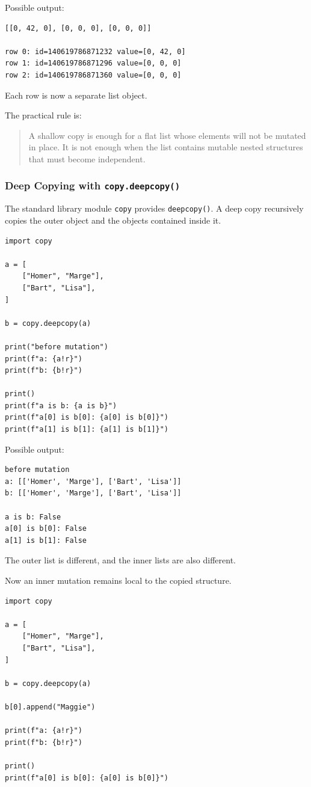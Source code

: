 Possible output:

\begin{verbatim}
[[0, 42, 0], [0, 0, 0], [0, 0, 0]]

row 0: id=140619786871232 value=[0, 42, 0]
row 1: id=140619786871296 value=[0, 0, 0]
row 2: id=140619786871360 value=[0, 0, 0]
\end{verbatim}

Each row is now a separate list object.

The practical rule is:

\begin{quote}
A shallow copy is enough for a flat list whose elements will not be mutated in place. It is not enough when the list contains mutable nested structures that must become independent.
\end{quote}

\subsubsection{Deep Copying with \texttt{copy.deepcopy()}}

The standard library module \texttt{copy} provides \texttt{deepcopy()}. A deep copy recursively copies the outer object and the objects contained inside it.

\begin{verbatim}
import copy

a = [
    ["Homer", "Marge"],
    ["Bart", "Lisa"],
]

b = copy.deepcopy(a)

print("before mutation")
print(f"a: {a!r}")
print(f"b: {b!r}")

print()
print(f"a is b: {a is b}")
print(f"a[0] is b[0]: {a[0] is b[0]}")
print(f"a[1] is b[1]: {a[1] is b[1]}")
\end{verbatim}

Possible output:

\begin{verbatim}
before mutation
a: [['Homer', 'Marge'], ['Bart', 'Lisa']]
b: [['Homer', 'Marge'], ['Bart', 'Lisa']]

a is b: False
a[0] is b[0]: False
a[1] is b[1]: False
\end{verbatim}

The outer list is different, and the inner lists are also different.

Now an inner mutation remains local to the copied structure.

\begin{verbatim}
import copy

a = [
    ["Homer", "Marge"],
    ["Bart", "Lisa"],
]

b = copy.deepcopy(a)

b[0].append("Maggie")

print(f"a: {a!r}")
print(f"b: {b!r}")

print()
print(f"a[0] is b[0]: {a[0] is b[0]}")
\end{verbatim}

